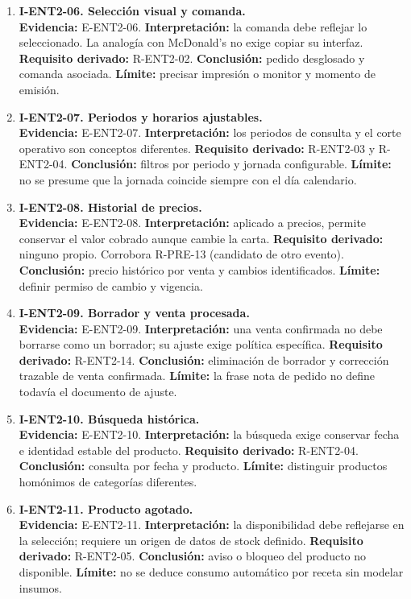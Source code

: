 {\begin{enumerate}
  \item \textbf{I-ENT2-06. Selección visual y comanda.}\\
  \textbf{Evidencia:} E-ENT2-06. \textbf{Interpretación:} la comanda debe
  reflejar lo seleccionado. La analogía con McDonald's no exige copiar su
  interfaz. \textbf{Requisito derivado:} R-ENT2-02. \textbf{Conclusión:}
  pedido desglosado y comanda asociada. \textbf{Límite:} precisar impresión
  o monitor y momento de emisión.

  \item \textbf{I-ENT2-07. Periodos y horarios ajustables.}\\
  \textbf{Evidencia:} E-ENT2-07. \textbf{Interpretación:} los periodos de
  consulta y el corte operativo son conceptos diferentes.
  \textbf{Requisito derivado:} R-ENT2-03 y R-ENT2-04. \textbf{Conclusión:}
  filtros por periodo y jornada configurable. \textbf{Límite:} no se presume
  que la jornada coincide siempre con el día calendario.

  \item \textbf{I-ENT2-08. Historial de precios.}\\
  \textbf{Evidencia:} E-ENT2-08. \textbf{Interpretación:} aplicado a
  precios, permite conservar el valor cobrado aunque cambie la carta.
  \textbf{Requisito derivado:} ninguno propio. Corrobora R-PRE-13
  (candidato de otro evento). \textbf{Conclusión:} precio histórico por
  venta y cambios identificados. \textbf{Límite:} definir permiso de cambio y
  vigencia.

  \item \textbf{I-ENT2-09. Borrador y venta procesada.}\\
  \textbf{Evidencia:} E-ENT2-09. \textbf{Interpretación:} una venta
  confirmada no debe borrarse como un borrador; su ajuste exige política
  específica. \textbf{Requisito derivado:} R-ENT2-14. \textbf{Conclusión:}
  eliminación de borrador y corrección trazable de venta confirmada.
  \textbf{Límite:} la frase nota de pedido no define todavía el documento de
  ajuste.

  \item \textbf{I-ENT2-10. Búsqueda histórica.}\\
  \textbf{Evidencia:} E-ENT2-10. \textbf{Interpretación:} la búsqueda exige
  conservar fecha e identidad estable del producto. \textbf{Requisito
  derivado:} R-ENT2-04. \textbf{Conclusión:} consulta por fecha y producto.
  \textbf{Límite:} distinguir productos homónimos de categorías diferentes.

  \item \textbf{I-ENT2-11. Producto agotado.}\\
  \textbf{Evidencia:} E-ENT2-11. \textbf{Interpretación:} la disponibilidad
  debe reflejarse en la selección; requiere un origen de datos de stock
  definido. \textbf{Requisito derivado:} R-ENT2-05. \textbf{Conclusión:}
  aviso o bloqueo del producto no disponible. \textbf{Límite:} no se deduce
  consumo automático por receta sin modelar insumos.


\end{enumerate}}
